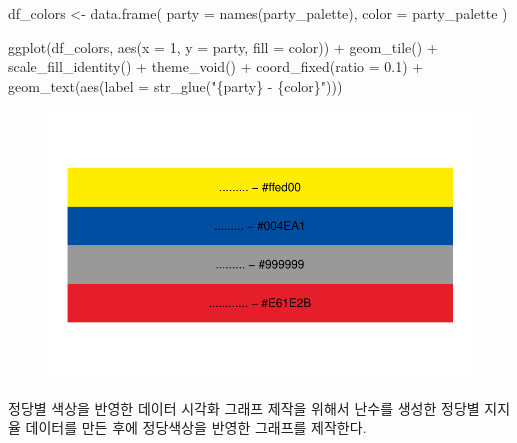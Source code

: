 \documentclass[
  letterpaper,
]{book}
\newenvironment{Shaded}{\begin{snugshade}}{\end{snugshade}}
\newcommand{\AttributeTok}[1]{\textcolor[rgb]{0.40,0.45,0.13}{#1}}
\newcommand{\DecValTok}[1]{\textcolor[rgb]{0.68,0.00,0.00}{#1}}
\newcommand{\FloatTok}[1]{\textcolor[rgb]{0.68,0.00,0.00}{#1}}
\newcommand{\FunctionTok}[1]{\textcolor[rgb]{0.28,0.35,0.67}{#1}}
\newcommand{\NormalTok}[1]{\textcolor[rgb]{0.00,0.23,0.31}{#1}}
\newcommand{\OtherTok}[1]{\textcolor[rgb]{0.00,0.23,0.31}{#1}}
\newcommand{\SpecialCharTok}[1]{\textcolor[rgb]{0.37,0.37,0.37}{#1}}
\newcommand{\StringTok}[1]{\textcolor[rgb]{0.13,0.47,0.30}{#1}}
\begin{document}
\begin{Shaded}
\begin{Highlighting}[]
\NormalTok{df\_colors }\OtherTok{\textless{}{-}} \FunctionTok{data.frame}\NormalTok{(}
  \AttributeTok{party =} \FunctionTok{names}\NormalTok{(party\_palette),}
  \AttributeTok{color =}\NormalTok{ party\_palette}
\NormalTok{)}

\FunctionTok{ggplot}\NormalTok{(df\_colors, }\FunctionTok{aes}\NormalTok{(}\AttributeTok{x =} \DecValTok{1}\NormalTok{, }\AttributeTok{y =}\NormalTok{ party, }\AttributeTok{fill =}\NormalTok{ color)) }\SpecialCharTok{+}
  \FunctionTok{geom\_tile}\NormalTok{() }\SpecialCharTok{+}
  \FunctionTok{scale\_fill\_identity}\NormalTok{() }\SpecialCharTok{+}
  \FunctionTok{theme\_void}\NormalTok{() }\SpecialCharTok{+}
  \FunctionTok{coord\_fixed}\NormalTok{(}\AttributeTok{ratio =} \FloatTok{0.1}\NormalTok{) }\SpecialCharTok{+}
  \FunctionTok{geom\_text}\NormalTok{(}\FunctionTok{aes}\NormalTok{(}\AttributeTok{label =} \FunctionTok{str\_glue}\NormalTok{(}\StringTok{"\{party\} {-} \{color\}"}\NormalTok{)))}
\end{Highlighting}
\end{Shaded}

\begin{figure}[H]

{\centering \includegraphics{colors_files/figure-pdf/unnamed-chunk-4-1.pdf}

}

\end{figure}

정당별 색상을 반영한 데이터 시각화 그래프 제작을 위해서 난수를 생성한
정당별 지지율 데이터를 만든 후에 정당색상을 반영한 그래프를 제작한다.
\end{document}
